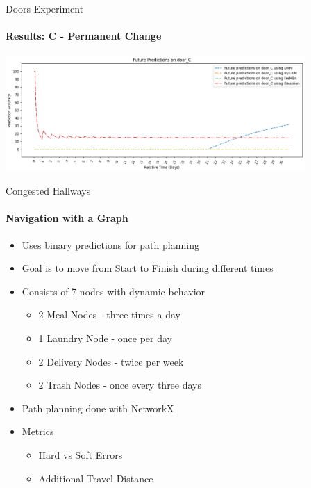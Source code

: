 \documentclass{beamer}
\begin{document}
\begin{frame}[t]{Doors Experiment}
  \framesubtitle{Results: C - Permanent Change}
  {\includegraphics[width = 4.5in]{images/results/Future_Predictions_on_door_C.png}}

  \begin{table}[h!]
    \centering
  \end{table}

\end{frame}


\begin{frame}[t]{Congested Hallways}
  \framesubtitle{Navigation with a Graph}
  \begin{itemize}
    \setlength\itemsep{.5em}
    \item Uses binary predictions for path planning
    \item Goal is to move from Start to Finish during different times
    \item Consists of 7 nodes with dynamic behavior
    \begin{itemize}
      \item 2 Meal Nodes - three times a day
      \item 1 Laundry Node - once per day
      \item 2 Delivery Nodes - twice per week
      \item 2 Trash Nodes - once every three days
    \end{itemize}
  \item Path planning done with NetworkX
  \item Metrics
  \begin{itemize}
    \item Hard vs Soft Errors
    \item Additional Travel Distance
  \end{itemize}

  \end{itemize}
\end{frame}
\end{document}

